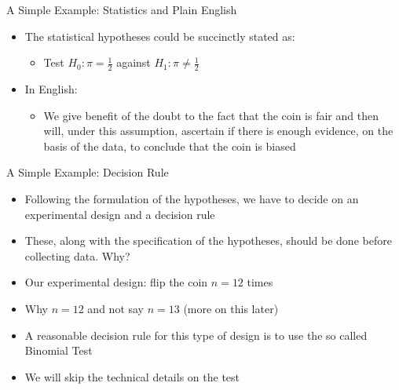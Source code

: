 \documentclass[xcolor=x11names,compress]{beamer}\usepackage[]{graphicx}\usepackage[]{color}
\begin{document}
\begin{frame}{A Simple Example: Statistics and Plain English}
  \begin{itemize}
  \item The statistical hypotheses could be succinctly stated as:
    \begin{itemize}
    \item Test $H_0: \pi=\frac{1}{2}$ against $H_1:\pi\ne\frac{1}{2}$
    \end{itemize}
  \item In English: 
    
     \begin{itemize}
    \item
    We give benefit of the doubt to the fact that the coin is fair
        and then will, under this assumption, ascertain if there is enough
        evidence, on the basis of the data, to conclude that the coin is biased
    \end{itemize}
  \end{itemize}
\end{frame}

\begin{frame}{A Simple Example: Decision Rule}
  \begin{itemize}
  \item Following the formulation of the hypotheses, we have to decide on an
        experimental design and a decision rule
  \item These, along with the specification of the hypotheses,
        should be done before collecting data. Why?
  \item Our experimental design: flip the coin $n=12$ times
  \item Why $n=12$ and not say $n=13$ (more on this later)
  \item A reasonable decision rule for this type of design
        is to use the so called Binomial
        Test 
  \item We will skip the technical details on the test
  \end{itemize}
\end{frame}
\end{document}
